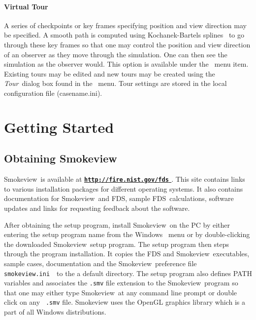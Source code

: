 \documentclass[11pt,twoside]{book}
\newcommand{\svini}{{\tt smokeview.ini}\ }
\newcommand{\hhref}[1]{\href{#1}{{\tt #1}
}}
\newcommand{\fds}{{FDS}}
\newcommand{\Smokeview}{{Smokeview}}
\newcommand{\smokeview}{{Smokeview}}
\newcommand{\tourmenu}{\fbox{\tt Tour} }
\newcommand{\frameit}[1]{\fbox{\tt #1}}
\begin{document}
\subsubsection{Virtual Tour}   A series of checkpoints or key frames
specifying position and view direction may be specified. A smooth
path is computed using Kochanek-Bartels splines~\cite{Moller:02} to
go through these key frames so that one may control the position
and view direction of an observer as they move through the
simulation. One can then see the simulation as the observer would.
This option is available under the \tourmenu\ menu item. Existing
tours may be edited and new tours may be created using the
{\em Tour}\ dialog box found in the \frameit{Dialogs}\ menu. Tour
settings are stored in the local configuration file
(casename.ini).












\chapter{Getting Started}

\section{Obtaining Smokeview}

\Smokeview\ is available at {\bf \hhref{http://fire.nist.gov/fds}}. This site contains links to various installation
packages for different operating systems. It also
contains documentation for \smokeview\ and \fds, sample \fds\ calculations, software updates and links for requesting feedback about the software.

After obtaining the setup program, install \smokeview\  on the PC
by either entering the setup program name from the Windows
\ menu or by double-clicking the downloaded
\smokeview\  setup program. The setup program then steps through
the program installation. It copies the FDS and \smokeview\
executables, sample cases, documentation and the \smokeview\
preference file \svini\ to the a default directory.  The setup program also
defines PATH variables and associates the {\tt .smv} file
extension to the \smokeview\ program so that one may either type
\smokeview\ at any command line prompt or double click on any {\tt
.smv} file. Smokeview uses the OpenGL graphics library which is a
part of all Windows distributions.
\end{document}
